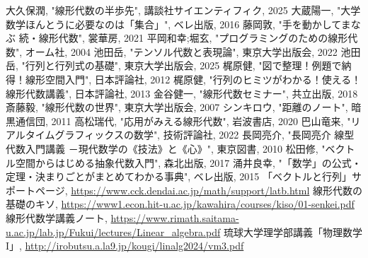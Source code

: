 \documentclass[b5paper,12pt,notitlepage]{jsreport}
\begin{document}
\begin{thebibliography}{99}
   大久保潤, "線形代数の半歩先", 講談社サイエンティフィク, 2025
   大蔵陽一, "大学数学ほんとうに必要なのは「集合」", ベレ出版, 2016
   藤岡敦, "手を動かしてまなぶ 続・線形代数", 裳華房, 2021
   平岡和幸;堀玄, "プログラミングのための線形代数", オーム社, 2004
   池田岳, "テンソル代数と表現論", 東京大学出版会, 2022
   池田岳, "行列と行列式の基礎", 東京大学出版会, 2025
   梶原健, "図で整理！例題で納得！線形空間入門", 日本評論社, 2012
   梶原健, "行列のヒミツがわかる！使える！線形代数講義", 日本評論社, 2013
   金谷健一, "線形代数セミナー", 共立出版, 2018
   斎藤毅, "線形代数の世界", 東京大学出版会, 2007
   シンキロウ, "距離のノート", 暗黒通信団, 2011
   高松瑞代, "応用がみえる線形代数", 岩波書店, 2020
   巴山竜来, "リアルタイムグラフィックスの数学", 技術評論社, 2022
   長岡亮介, "長岡亮介 線型代数入門講義 －現代数学の《技法》と《心》", 東京図書, 2010
   松田修, "ベクトル空間からはじめる抽象代数入門", 森北出版, 2017
   涌井良幸, "「数学」の公式・定理・決まりごとがまとめてわかる事典", ベレ出版, 2015
   「ベクトルと行列」サポートページ, \url{https://www.cck.dendai.ac.jp/math/support/latb.html}
   線形代数の基礎のキソ, \url{https://www1.econ.hit-u.ac.jp/kawahira/courses/kiso/01-senkei.pdf}
   線形代数学講義ノート, \url{https://www.rimath.saitama-u.ac.jp/lab.jp/Fukui/lectures/Linear_algebra.pdf}
   琉球大学理学部講義「物理数学 I」, \url{http://irobutsu.a.la9.jp/kougi/linalg2024/vm3.pdf}
\end{thebibliography}
\end{document}
